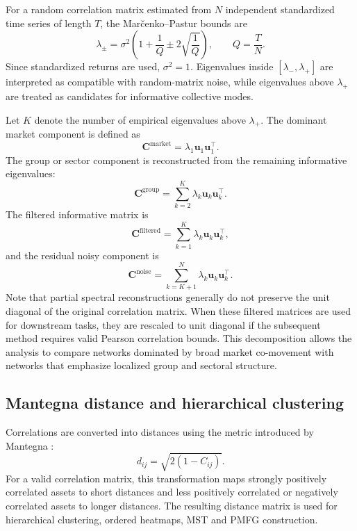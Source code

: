 For a random correlation matrix estimated from $N$ independent standardized time series of length $T$, the Mar\v{c}enko--Pastur bounds are
\begin{equation}
\lambda_{\pm}
=
\sigma^2
\left(
1+\frac{1}{Q}
\pm
2\sqrt{\frac{1}{Q}}
\right),
\qquad
Q=\frac{T}{N}.
\end{equation}
Since standardized returns are used, $\sigma^2=1$. Eigenvalues inside $[\lambda_-,\lambda_+]$ are interpreted as compatible with random-matrix noise, while eigenvalues above $\lambda_+$ are treated as candidates for informative collective modes.

Let $K$ denote the number of empirical eigenvalues above $\lambda_+$. The dominant market component is defined as
\begin{equation}
\mathbf{C}^{\mathrm{market}}
=
\lambda_1
\mathbf{u}_1
\mathbf{u}_1^{\top}.
\end{equation}
The group or sector component is reconstructed from the remaining informative eigenvalues:
\begin{equation}
\mathbf{C}^{\mathrm{group}}
=
\sum_{k=2}^{K}
\lambda_k
\mathbf{u}_k
\mathbf{u}_k^{\top}.
\end{equation}
The filtered informative matrix is
\begin{equation}
\mathbf{C}^{\mathrm{filtered}}
=
\sum_{k=1}^{K}
\lambda_k
\mathbf{u}_k
\mathbf{u}_k^{\top},
\end{equation}
and the residual noisy component is
\begin{equation}
\mathbf{C}^{\mathrm{noise}}
=
\sum_{k=K+1}^{N}
\lambda_k
\mathbf{u}_k
\mathbf{u}_k^{\top}.
\end{equation}
Note that partial spectral reconstructions generally do not preserve the unit diagonal of the original correlation matrix. When these filtered matrices are used for downstream tasks, they are rescaled to unit diagonal if the subsequent method requires valid Pearson correlation bounds. This decomposition allows the analysis to compare networks dominated by broad market co-movement with networks that emphasize localized group and sectoral structure.

\subsection{Mantegna distance and hierarchical clustering}
\label{subsec:distance_clustering_method}

Correlations are converted into distances using the metric introduced by Mantegna \cite{mantegna_1999_hierarchical}:
\begin{equation}
d_{ij}
=
\sqrt{2(1-C_{ij})}.
\end{equation}
For a valid correlation matrix, this transformation maps strongly positively correlated assets to short distances and less positively correlated or negatively correlated assets to longer distances. The resulting distance matrix is used for hierarchical clustering, ordered heatmaps, MST and PMFG construction.

